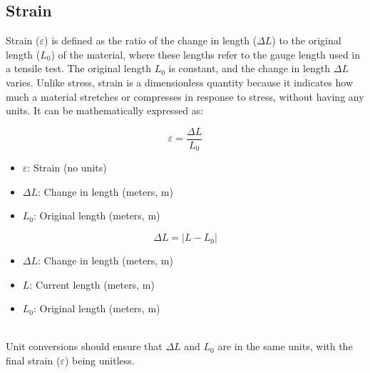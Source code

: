 \documentclass{article}
\begin{document}
        \subsection{Strain}
        Strain ($\varepsilon$) is defined as the ratio of the change in length ($\Delta L$) to the original length ($L_0$) of the material, where these lengths refer to the gauge length used in a tensile test. The original length \(L_0\) is constant, and the change in length \(\Delta L\) varies. Unlike stress, strain is a dimensionless quantity because it indicates how much a material stretches or compresses in response to stress, without having any units. It can be mathematically expressed as:\\[8pt]
        
        \begin{minipage}{0.48\textwidth}
            \begin{equation}
                \varepsilon = \frac{\Delta L}{L_0}
                \label{eq:strain}
            \end{equation}
            \begin{itemize}[left=0pt,itemsep=-1mm]
                \item \( \varepsilon \): Strain (no units)
                \item \( \Delta L \): Change in length (meters, \(\text{m}\))
                \item \( L_0 \): Original length (meters, \(\text{m}\))    
            \end{itemize}
        \end{minipage}\hfill
        \begin{minipage}{0.48\textwidth}
            \begin{equation}
                \Delta L = \left| L - L_0 \right|
                \label{eq:deltaL}
            \end{equation}
            \begin{itemize}[left=0pt,itemsep=-1mm]
                \item \( \Delta L \): Change in length (meters, \(\text{m}\))
                \item \( L \): Current length (meters, \(\text{m}\))\footnotemark
                \item \( L_0 \): Original length (meters, \(\text{m}\))
            \end{itemize}
        \end{minipage}\\[8pt]
        Unit conversions should ensure that $\Delta L$ and $L_0$ are in the same units, with the final strain ($\varepsilon$) being unitless.\\[8pt]
\end{document}
